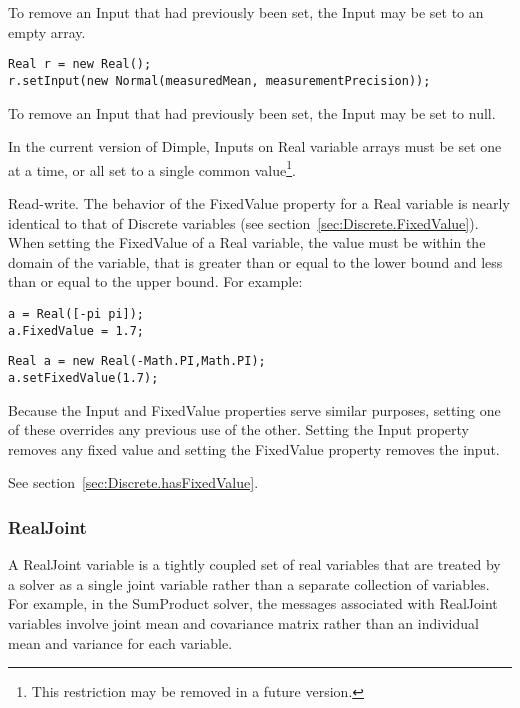 To remove an Input that had previously been set, the Input may be set to an empty array.

\fi

\ifjava

\begin{lstlisting}
Real r = new Real();
r.setInput(new Normal(measuredMean, measurementPrecision));
\end{lstlisting}

To remove an Input that had previously been set, the Input may be set to null.

\fi

\ifmatlab
In the current version of Dimple, Inputs on Real variable arrays must be set one at a time, or all set to a single common value\footnote{This restriction may be removed in a future version.}.
\fi


Read-write.  The behavior of the FixedValue property for a Real variable is nearly identical to that of Discrete variables (see section~\ref{sec:Discrete.FixedValue}).  When setting the FixedValue of a Real variable, the value must be within the domain of the variable, that is greater than or equal to the lower bound and less than or equal to the upper bound.  For example:

\ifmatlab
\begin{lstlisting}
a = Real([-pi pi]);
a.FixedValue = 1.7;
\end{lstlisting}
\fi

\ifjava
\begin{lstlisting}
Real a = new Real(-Math.PI,Math.PI);
a.setFixedValue(1.7);
\end{lstlisting}
\fi

Because the Input and FixedValue properties serve similar purposes, setting one of these overrides any previous use of the other.  Setting the Input property removes any fixed value and setting the FixedValue property removes the input.




See section~\ref{sec:Discrete.hasFixedValue}.



\subsubsection{RealJoint}

A RealJoint variable is a tightly coupled set of real variables that are treated by a solver as a single joint variable rather than a separate collection of variables.  For example, in the SumProduct solver, the messages associated with RealJoint variables involve joint mean and covariance matrix rather than an individual mean and variance for each variable.

